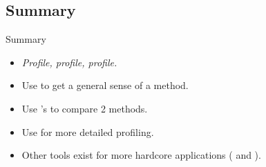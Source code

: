 \subsection{Summary}
\makesubcontentsslidessec


\begin{frame}
  \begin{block}{Summary}
    \begin{itemize}
      \item \emph{Profile, profile, profile.}
      \item Use  to get a general sense of a method.
      \item Use 's  to compare 2 methods.
      \item Use  for more detailed profiling.
      \item Other tools exist for more hardcore applications ( and 
).
    \end{itemize}
  \end{block}
\end{frame}